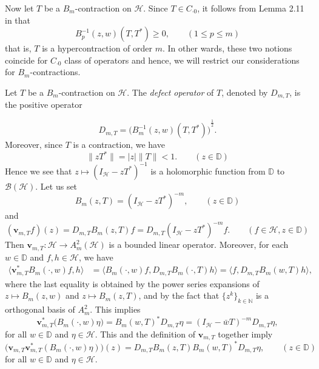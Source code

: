 \documentclass[12pt]{amsart}
\begin{document}
Now let $T$ be a $B_m$-contraction on ${\mathcal{H}}$. Since $T \in C_{\cdot
0}$, it follows from Lemma 2.11 in \cite{Ag} that
\[B_p^{-1}(z, w)(T, T^*) \geq 0, \quad \quad (1 \leq p \leq m)\]that
is, $T$ is a hypercontraction of order $m$. In other wards, these
two notions coincide for $C_{\cdot 0}$ class of operators and hence,
we will restrict our considerations for $B_m$-contractions.

Let $T$ be a $B_m$-contraction on ${\mathcal{H}}$. The \textit{defect
operator} of $T$, denoted by $D_{m,T}$, is the positive operator

\begin{equation}\label{defect}D_{m, T} = {\Big(B^{-1}_m(z, w)(T,
T^*)\Big)}^{\frac{1}{2}}.\end{equation} Moreover, since $T$ is a
contraction, we have \[\|z T^*\| = |z| \|T\| < 1. \quad \quad (z \in
{\mathbb{D}})\] Hence we see that $z \mapsto (I_{\mathcal{H}} - z T^*)^{-1}$ is a
holomorphic function from ${\mathbb{D}}$ to ${\mathcal{B}}({\mathcal{H}})$. Let us set
\begin{equation}\label{BzT}B_m(z, T) = (I_{\mathcal{H}} - z T^*)^{-m},
\quad \quad (z \in {\mathbb{D}})\end{equation} and
\begin{equation}\label{v}(\bm{v}_{m, T} f)(z) =
D_{m,T} B_m(z, T) f = D_{m,T} (I_{\mathcal{H}} - z T^*)^{-m} f. \quad \quad
(f \in {\mathcal{H}}, z \in {\mathbb{D}})\end{equation} Then $\bm{v}_{m, T} : {\mathcal{H}}
{\rightarrow} A^2_m ({\mathcal{H}})$ is a bounded linear operator. Moreover, for each
$w \in {\mathbb{D}}$ and $f, h \in {\mathcal{H}}$, we have
\[\begin{split} \langle {\bm{v}}_{m,T}^* B_m(\cdot, w) f, h\rangle &=
\langle B_m(\cdot, w) f, D_{m,T} B_m(\cdot, T) h\rangle = \langle f,
D_{m,T} B_m(w, T) h\rangle,
\end{split}\]where the last equality is obtained by the power series expansions of $z
\mapsto B_m(z, w)$ and $z \mapsto B_m(z, T)$, and by the fact that
$\{z^k\}_{k \in {\mathbb{N}}}$ is a orthogonal basis of $A^2_m$. This implies
\begin{equation}\label{v*} {\bm{v}}_{m, T}^*\Big(B_m(\cdot, w) \eta \Big) =
B_m(w, T)^* D_{m,T} \eta = (I_{\mathcal{H}} - \bar{w} T)^{-m} D_{m,T}
\eta,\end{equation}for all $w \in {\mathbb{D}}$ and $\eta \in {\mathcal{H}}$. This and
the definition of ${\bm{v}}_{m,T}$ together imply
\begin{equation}\label{vv*} \Big({\bm{v}}_{m, T} {\bm{v}}_{m, T}^* (B_m(\cdot,
w) \eta )\Big)(z) = D_{m, T} B_m(z, T) B_m(w, T)^* D_{m,T}\eta,
\quad \quad (z \in {\mathbb{D}})\end{equation}for all $w \in {\mathbb{D}}$ and $\eta \in
{\mathcal{H}}$.
\end{document}
